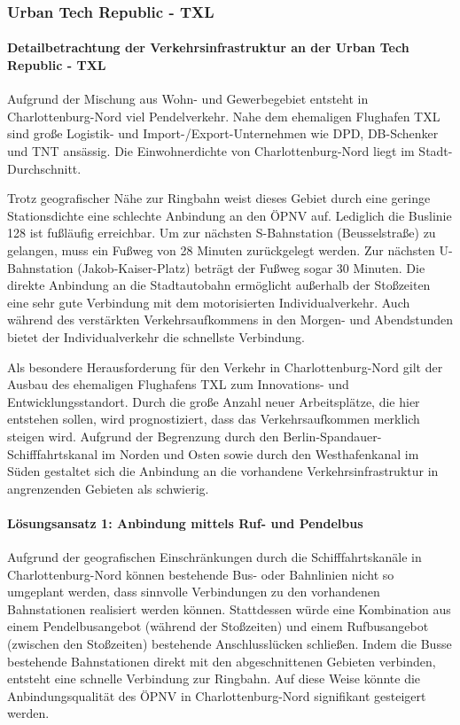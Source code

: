 \subsubsection{Urban Tech Republic - TXL}
\paragraph{Detailbetrachtung der Verkehrsinfrastruktur an der Urban Tech Republic - TXL}
Aufgrund der Mischung aus Wohn- und Gewerbegebiet entsteht in Charlottenburg-Nord viel Pendelverkehr. Nahe dem ehemaligen Flughafen TXL sind große Logistik- und Import-/Export-Unternehmen wie DPD, DB-Schenker und TNT ansässig. Die Einwohnerdichte von Charlottenburg-Nord liegt im Stadt-Durchschnitt.

Trotz geografischer Nähe zur Ringbahn weist dieses Gebiet durch eine geringe Stationsdichte eine schlechte Anbindung an den ÖPNV auf. Lediglich die Buslinie 128 ist fußläufig erreichbar. Um zur nächsten S-Bahnstation (Beusselstraße) zu gelangen, muss ein Fußweg von 28 Minuten zurückgelegt werden. Zur nächsten U-Bahnstation (Jakob-Kaiser-Platz) beträgt der Fußweg sogar 30 Minuten. Die direkte Anbindung an die Stadtautobahn ermöglicht außerhalb der Stoßzeiten eine sehr gute Verbindung mit dem motorisierten Individualverkehr. Auch während des verstärkten Verkehrsaufkommens in den Morgen- und Abendstunden bietet der Individualverkehr die schnellste Verbindung.


Als besondere Herausforderung für den Verkehr in Charlottenburg-Nord gilt der Ausbau des ehemaligen Flughafens TXL zum Innovations- und Entwicklungsstandort. Durch die große Anzahl neuer Arbeitsplätze, die hier entstehen sollen, wird prognostiziert, dass das Verkehrsaufkommen merklich steigen wird. Aufgrund der Begrenzung durch den Berlin-Spandauer-Schifffahrtskanal im Norden und Osten sowie durch den Westhafenkanal im Süden gestaltet sich die Anbindung an die vorhandene Verkehrsinfrastruktur in angrenzenden Gebieten als schwierig.

\paragraph{Lösungsansatz 1: Anbindung mittels Ruf- und Pendelbus}
Aufgrund der geografischen Einschränkungen durch die Schifffahrtskanäle in Charlottenburg-Nord können bestehende Bus- oder Bahnlinien nicht so umgeplant werden, dass sinnvolle Verbindungen zu den vorhandenen Bahnstationen realisiert werden können. Stattdessen würde eine Kombination aus einem Pendelbusangebot (während der Stoßzeiten) und einem Rufbusangebot (zwischen den Stoßzeiten) bestehende Anschlusslücken schließen. Indem die Busse bestehende Bahnstationen direkt mit den abgeschnittenen Gebieten verbinden, entsteht eine schnelle Verbindung zur Ringbahn. Auf diese Weise könnte die Anbindungsqualität des ÖPNV in Charlottenburg-Nord signifikant gesteigert werden.


